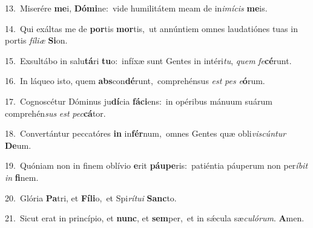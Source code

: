 {\numbfont\textcolor{\numbcolor}{13.}}~Miserére \textbf{me}\-i, \textbf{Dó}\-\textbf{mi}ne:~\star vide humilitátem meam de in\-\textit{i}\-\textit{mí}\textit{cis} \textbf{me}\-is.\par
{\numbfont\textcolor{\numbcolor}{14.}}~Qui exáltas me de \textbf{por}\-tis \textbf{mor}\-tis,~\star ut annúntiem omnes laudatiónes tuas in portis \textit{fí}\-\textit{li}\textit{æ} \textbf{Si}\-on.\par
{\numbfont\textcolor{\numbcolor}{15.}}~Exsultábo in salu\-\textbf{tá}\-ri \textbf{tu}\-o:~\star infíxæ sunt Gentes in intéri\-\textit{tu}\-, \textit{quem} \textit{fe}\-\textbf{cé}runt.\par
{\numbfont\textcolor{\numbcolor}{16.}}~In láqueo isto, quem \textbf{abs}\-con\-\textbf{dé}\-runt,~\star comprehénsus \textit{est} \textit{pes} \textit{e}\-\textbf{ó}rum.\par
{\numbfont\textcolor{\numbcolor}{17.}}~Cognoscétur Dóminus ju\-\textbf{dí}\-cia \textbf{fá}\-\textbf{ci}ens:~\star in opéribus mánuum suárum comprehén\textit{sus} \textit{est} \textit{pec}\-\textbf{cá}tor.\par
{\numbfont\textcolor{\numbcolor}{18.}}~Convertántur peccatóres \textbf{in} in\-\textbf{fér}\-num,~\star omnes Gentes quæ obli\-\textit{vis}\-\textit{cún}\textit{tur} \textbf{De}\-um.\par
{\numbfont\textcolor{\numbcolor}{19.}}~Quóniam non in finem oblívio \textbf{e}\-rit \textbf{páu}\-\textbf{pe}ris:~\star patiéntia páuperum non per\-\textit{í}\-\textit{bit} \textit{in} \textbf{fi}\-nem.\par
{\numbfont\textcolor{\numbcolor}{20.}}~Glória \textbf{Pa}\-tri, et \textbf{Fí}\-\textbf{li}o,~\star et Spi\-\textit{rí}\-\textit{tu}\textit{i} \textbf{Sanc}\-to.\par
{\numbfont\textcolor{\numbcolor}{21.}}~Sicut erat in princípio, et \textbf{nunc}\-, et \textbf{sem}\-per,~\star et in sǽcula sæ\-\textit{cu}\-\textit{ló}\textit{rum}. \textbf{A}\-men.\par
